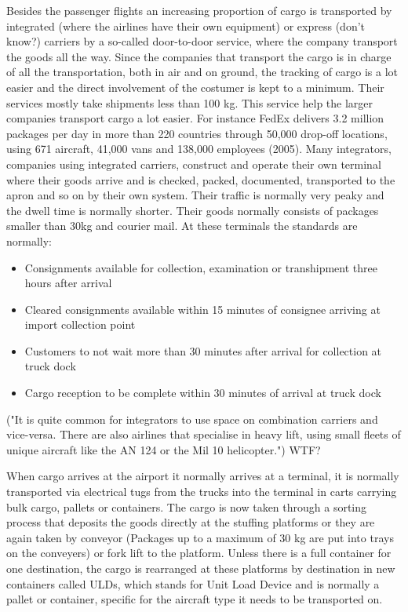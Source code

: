 Besides the passenger flights an increasing proportion of cargo is transported by integrated (where the airlines have their own equipment) or express (don't know?) %
carriers by a so-called door-to-door service, where the company transport the goods all the way. Since the companies that transport the cargo is in charge of all the transportation, both in air and on ground, the tracking of cargo is a lot easier and the direct involvement of the costumer is kept to a minimum. Their services mostly take shipments less than 100 kg. This service help the larger companies transport cargo a lot easier. For instance FedEx delivers 3.2 million packages per day in more than 220 countries through 50,000 drop-off locations, using 671 aircraft, 41,000 vans and 138,000 employees (2005).
Many integrators, companies using integrated carriers, construct and operate their own terminal where their goods arrive and is checked, packed, documented, transported to the apron and so on by their own system. 
Their traffic is normally very peaky and the dwell time is normally shorter. Their goods normally consists of packages smaller than 30kg and courier mail. At these terminals the standards are normally:
\begin{itemize}
\item Consignments available for collection, examination or transhipment%
 three hours after arrival
\item Cleared consignments available within 15 minutes of consignee arriving at import collection point
\item Customers to not wait more than 30 minutes after arrival for collection at truck dock
\item Cargo reception to be complete within 30 minutes of arrival at truck dock
\end{itemize}

("It is quite common for integrators to use space on combination carriers and vice-versa. There are also airlines that specialise in heavy lift, using small fleets of unique aircraft like the AN 124 or the Mil 10 helicopter.") WTF?


When cargo arrives at the airport it normally arrives at a terminal, it is normally transported via electrical tugs from the trucks into the terminal in carts carrying bulk cargo, pallets or containers. The cargo is now taken through a sorting process that deposits the goods directly at the stuffing platforms or they are again taken by conveyor (Packages up to a maximum of 30 kg are put into trays on the conveyers) or fork lift to the platform.
Unless there is a full container for one destination, the cargo is rearranged at these platforms by destination in new containers called ULDs, which stands for Unit Load Device and is normally a pallet or container, specific for the aircraft type it needs to be transported on.


